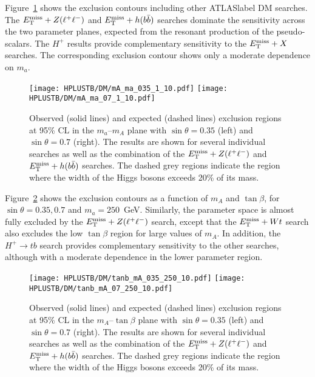 Figure~\ref{Hplustb:2HDMa_mA_ma} shows the exclusion contours including other \acrshort{ATLASlabel} DM searches. The $E_{\text{T}}^{\text{miss}}+ Z(\ell^+\ell^-)$ and $E_{\text{T}}^{\text{miss}}+ h(b\bar{b})$ searches dominate the sensitivity across the two parameter planes, expected from the resonant production of the pseudo-scalars. The $H^+$ results provide complementary sensitivity to the $E_{\text{T}}^{\text{miss}}+ X$ searches. The corresponding exclusion contour shows only a moderate dependence on $m_a$.\\

\begin{figure}[htb]
    \RawFloats
    \centering
    \texttt{[image: HPLUSTB/DM/mA\_ma\_035\_1\_10.pdf]}
    \texttt{[image: HPLUSTB/DM/mA\_ma\_07\_1\_10.pdf]}
    \caption{Observed (solid lines) and expected (dashed lines) exclusion regions at 95\% CL in the $m_a$--$m_A$ plane with $\sin\theta=0.35$ (left) and $\sin\theta=0.7$ (right). The results are shown for several individual searches as well as the combination of the $E_{\text{T}}^{\text{miss}}+Z(\ell^+\ell^-)$ and $E_{\text{T}}^{\text{miss}}+h(b\bar{b})$ searches. The dashed grey regions indicate the region where the width of the Higgs bosons exceeds 20\% of its mass.}
    \label{Hplustb:2HDMa_mA_ma}
\end{figure}

Figure~\ref{Hplustb:2HDMa_tanb_mA} shows the exclusion contours as a function of $m_A$ and $\tan\beta$, for $\sin\theta=0.35,0.7$ and $m_a=250$~GeV. Similarly, the parameter space is almost fully excluded by the $E_{\text{T}}^{\text{miss}}+ Z(\ell^+\ell^-)$ search, except that the $E_{\text{T}}^{\text{miss}}+ Wt$ search also excludes the low $\tan\beta$ region for large values of $m_A$. In addition, the $H^+\to tb$ search provides complementary sensitivity to the other searches, although with a moderate dependence in the lower parameter region.\\

\begin{figure}[htb]
    \RawFloats
    \centering
    \texttt{[image: HPLUSTB/DM/tanb\_mA\_035\_250\_10.pdf]}
    \texttt{[image: HPLUSTB/DM/tanb\_mA\_07\_250\_10.pdf]}
    \caption{Observed (solid lines) and expected (dashed lines) exclusion regions at 95\% CL in the $m_A$--$\tan\beta$ plane with $\sin\theta=0.35$ (left) and $\sin\theta=0.7$ (right). The results are shown for several individual searches as well as the combination of the $E_{\text{T}}^{\text{miss}}+Z(\ell^+\ell^-)$ and $E_{\text{T}}^{\text{miss}}+h(b\bar{b})$ searches. The dashed grey regions indicate the region where the width of the Higgs bosons exceeds 20\% of its mass.}
    \label{Hplustb:2HDMa_tanb_mA}
\end{figure}

